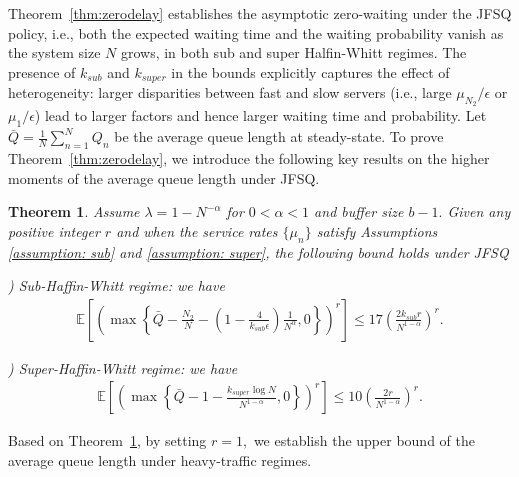 \documentclass[11pt,oneside,letter]{article}
\newtheorem{theorem}{Theorem}
\begin{document}
Theorem~\ref{thm:zerodelay} establishes the asymptotic zero-waiting under the JFSQ policy, i.e., both the expected waiting time and the waiting probability vanish as the system size $N$ grows, in both sub and super Halfin-Whitt regimes. The presence of $k_{sub}$ and $k_{super}$ in the bounds explicitly captures the effect of heterogeneity: larger disparities between fast and slow servers (i.e., large $\mu_{N_2}/\epsilon$ or $\mu_1/\epsilon$) lead to larger factors and hence larger waiting time and probability. Let $\bar Q = \frac{1}{N}\sum_{n=1}^{N} Q_n$ be the average queue length at steady-state.  To prove Theorem~\ref{thm:zerodelay}, we introduce the following key results on the higher moments of the average queue length under JFSQ. 
\begin{theorem} \label{thm:main}
Assume $\lambda=1- N^{-\alpha}$ for $0<\alpha<1$ and buffer size $b-1.$ 
Given any positive integer $r$ and when the service rates $\{\mu_{n}\}$ satisfy Assumptions \ref{assumption: sub} and \ref{assumption: super}, the following bound holds under JFSQ

) Sub-Haffin-Whitt regime: 
we have  
\begin{align}
\mathbb E\left[\left(\max\left\{\bar Q - \frac{N_2}{N} - \left(1-\frac{4}{k_{sub}\epsilon}\right)\frac{1}{N^{\alpha}}, 0\right\}\right)^r\right]
\leq {17\left( \frac{ 2k_{sub} r}{N^{1-\alpha}} \right)^r.} 
\end{align}  

) Super-Haffin-Whitt regime:  
we have  
\begin{align}
\mathbb E\left[\left(\max\left\{\bar Q -1-\frac{k_{super}\log N}{N^{1-\alpha}}, 0\right\}\right)^r\right]\leq 10 \left(\frac{2r}{N^{1-\alpha}}\right)^r.
\end{align} 
\end{theorem}
Based on Theorem~\ref{thm:main}, {by setting $r=1,$} we establish the upper bound of the average queue length under heavy-traffic regimes.
\end{document}
